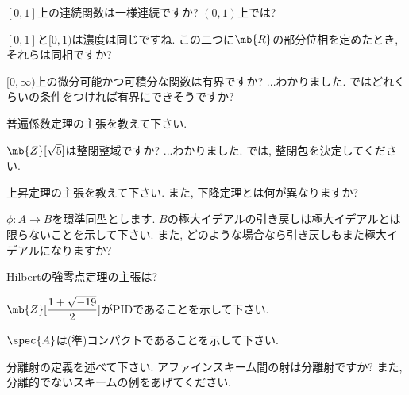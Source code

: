 \begin{prob}
$[0,1]$上の連続関数は一様連続ですか? $(0,1)$上では?
\end{prob}

\begin{prob}
$[0,1]$と$[0,1)$は濃度は同じですね.  この二つに$\mb{R}$の部分位相を定めたとき, それらは同相ですか? 
\end{prob}


\begin{prob}
$[0,\infty)$上の微分可能かつ可積分な関数は有界ですか? ...わかりました.  ではどれくらいの条件をつければ有界にできそうですか? 
\end{prob}


\begin{prob}
普遍係数定理の主張を教えて下さい. 
\end{prob}

\begin{prob}
$\mb{Z}[\sqrt{5}]$は整閉整域ですか? ...わかりました. では, 整閉包を決定してください. 
\end{prob}

\begin{prob}
上昇定理の主張を教えて下さい. また, 下降定理とは何が異なりますか? 
\end{prob}

\begin{prob}
$\phi:A\to B$を環準同型とします. $B$の極大イデアルの引き戻しは極大イデアルとは限らないことを示して下さい. また, どのような場合なら引き戻しもまた極大イデアルになりますか? 
\end{prob}

\begin{prob}
Hilbertの強零点定理の主張は? 
\end{prob}

\begin{prob}
$\mb{Z}[\dfrac{1+\sqrt{-19}}{2}]$がPIDであることを示して下さい. 
\end{prob}

\begin{prob}
$\spec{A}$は(準)コンパクトであることを示して下さい.
\end{prob}

\begin{prob}
分離射の定義を述べて下さい. アファインスキーム間の射は分離射ですか? また, 分離的でないスキームの例をあげてください. 
\end{prob}




